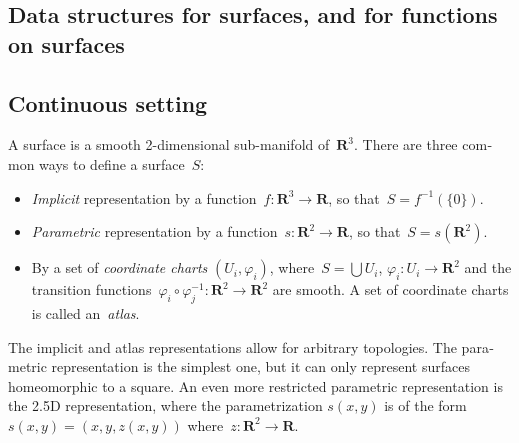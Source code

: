 \documentclass{article}
\def\R{\mathbf{R}} %
\begin{document}
\clearpage
\begin{otherlanguage}{british}
\section{Data structures for surfaces, and for functions on surfaces}

\subsection{Continuous setting}

A surface is a smooth 2-dimensional sub-manifold of~$\R^3$.
There are three common ways to define a surface~$S$:
\begin{itemize}
	\item \emph{Implicit} representation by a function~$f:\R^3\to\R$,
		so that~$S=f^{-1}(\{0\})$.
	\item \emph{Parametric} representation by a function~$s:\R^2\to\R$,
		so that~$S=s(\R^2)$.

	\item By a set of \emph{coordinate charts} $(U_i,\varphi_i)$,
		where~$S=\bigcup U_i$, $\varphi_i:U_i\to\R^2$ and the transition
		functions~$\varphi_i\circ\varphi_j^{-1}:\R^2\to\R^2$ are
		smooth.  A set of coordinate charts is called
		an~\emph{atlas}.
\end{itemize}
The implicit and atlas representations allow for arbitrary topologies.  The
parametric representation is the simplest one, but it can only represent
surfaces homeomorphic to a square.  An even more restricted parametric
representation is the 2.5D representation, where the parametrization $s(x,y)$
is of the form~$s(x,y)=(x,y,z(x,y))$ where~$z:\R^2\to\R$.


\end{otherlanguage}
\end{document}

